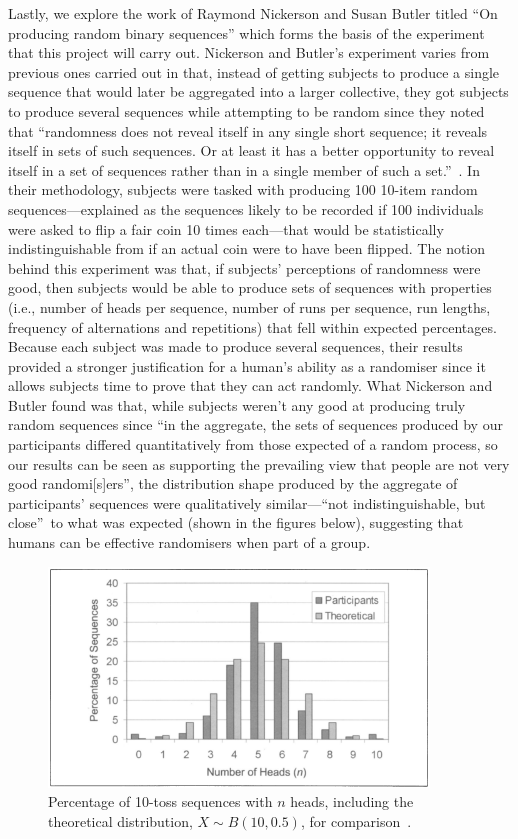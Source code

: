 Lastly, we explore the work of Raymond Nickerson and Susan Butler titled ``On producing random binary sequences'' which forms the basis of the experiment that this project will carry out. Nickerson and Butler's experiment varies from previous ones carried out in that, instead of getting subjects to produce a single sequence that would later be aggregated into a larger collective, they got subjects to produce several sequences while attempting to be random since they noted that ``randomness does not reveal itself in any single short sequence; it reveals itself in sets of such sequences. Or at least it has a better opportunity to reveal itself in a set of sequences rather than in a single member of such a set.''~\cite{nickerson:2009}. In their methodology, subjects were tasked with producing 100 10-item random sequences—explained as the sequences likely to be recorded if 100 individuals were asked to flip a fair coin 10 times each—that would be statistically indistinguishable from if an actual coin were to have been flipped. The notion behind this experiment was that, if subjects' perceptions of randomness were good, then subjects would be able to produce sets of sequences with properties (i.e., number of heads per sequence, number of runs per sequence, run lengths, frequency of alternations and repetitions) that fell within expected percentages. Because each subject was made to produce several sequences, their results provided a stronger justification for a human's ability as a randomiser since it allows subjects time to prove that they can act randomly. What Nickerson and Butler found was that, while subjects weren't any good at producing truly random sequences since ``in the aggregate, the sets of sequences produced by our participants differed quantitatively from those expected of a random process, so our results can be seen as supporting the prevailing view that people are not very good randomi[s]ers'', the distribution shape produced by the aggregate of participants' sequences were qualitatively similar—``not indistinguishable, but close''~\cite{nickerson:2009}\textemdash{}to what was expected (shown in the figures below), suggesting that humans can be effective randomisers when part of a group.
\begin{figure}[h]
    \centering
    \includegraphics[width=0.9\textwidth]{images/nickerson_2009_number_of_heads.png}
    \caption{Percentage of 10-toss sequences with $n$ heads, including the theoretical distribution, $X \sim B(10, 0.5)$, for comparison~\cite{nickerson:2009}.}
\end{figure}

